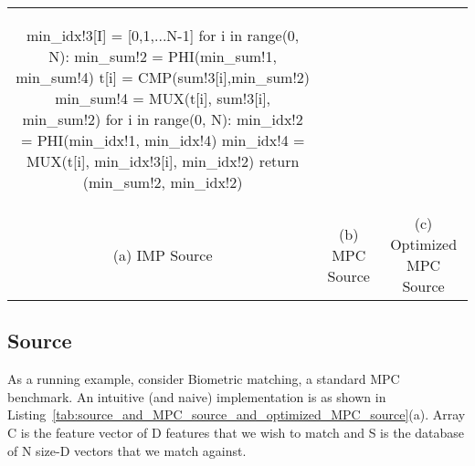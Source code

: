\begin{table*}
\begin{tabular}{ccc}
\begin{minipage}{0.33\textwidth}
{\begin{pythonn}
min_idx!3[I] = [0,1,...N-1]
for i in range(0, N):
   min_sum!2 = PHI(min_sum!1, min_sum!4)
   t[i] = CMP(sum!3[i],min_sum!2)
   min_sum!4 = MUX(t[i], sum!3[i], min_sum!2)
for i in range(0, N):
   min_idx!2 = PHI(min_idx!1, min_idx!4)
   min_idx!4 = MUX(t[i], min_idx!3[i], min_idx!2)
return (min_sum!2, min_idx!2)
\end{pythonn}
}
\end{minipage}

\\

(a) IMP Source & (b) MPC Source & (c) Optimized MPC Source
\end{tabular}
\caption{Biometric Matching: ==== From (a) IMP Source to (b) MPC Source: 
First, MPC Source is an SSA form.
Second, it is linear. The conditional in lines 13-14 in IMP Source turns into the linear code in lines 12-16 in MPC Source.
The test turns into the CMP operation {\sf t = CMP(sum!3,min\_sum!2)}, followed by the
true-branch sequence, followed by the MUX operations. The first MUX operation selects the value
of {\sf min\_sum}: if {\sf t} is true, then {\sf min\_sum} gets the value of the second multiplexer
argument,  {\sf min\_sum!3}, otherwise it takes the value of the third argument, {\sf min\_sum!2}.
Third, MPC Source is a special form of SSA. The SSA $\phi$-nodes at the if-then-else (lines 13-15) turn into
MUX operations, while the $\phi$-nodes at for-loops turn into \emph{pseudo} PHI nodes with a straightforward semantics.
==== From (b) MPC Source to (c) Optimized MPC Source: 
The compiler determines that SUB and MUL in ``naive'' MPC Source (lines 9 and 10 in (b))
can be fully vectorized into the SIMD SUB and MUL in optimized MPC Source (lines 9 and 10 in (c)).
Notation {\sf p[I,J]} denotes a 2-dimensional array with fully vectorized dimensions.
The computation of sum (line 11 in (b))
is sequential across the $j$-dimension, but it is parallel across the $i$-dimension.
The loop in lines 12-16 in (c) illustrates; here {\sf p[I,j]} refers to the $j$-th column in {\sf p}.
Unfortunately, CMP and MUX remain sequential.
}
\label{tab:source_and_MPC_source_and_optimized_MPC_source}
\end{table*}


\subsection{Source}

As a running example, consider Biometric matching, a standard MPC benchmark.
An intuitive (and naive) implementation is as shown in Listing~\ref{tab:source_and_MPC_source_and_optimized_MPC_source}(a).
Array {\sf C} is the feature vector of {\sf D} features that we wish to match and {\sf S}
is the database of {\sf N} size-{\sf D} vectors that we match against.

